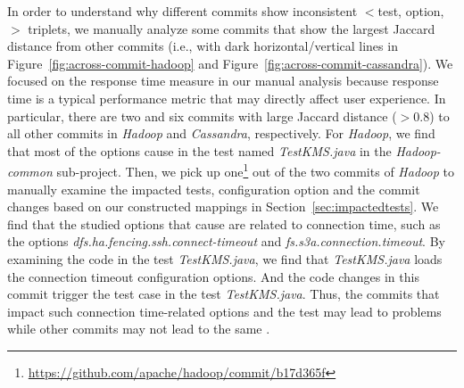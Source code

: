 In order to understand why different commits show inconsistent $<$test, option, \inconsistent$>$ triplets, 
we manually analyze some commits that show the largest Jaccard distance from other commits (i.e., with dark horizontal/vertical lines in Figure~\ref{fig:across-commit-hadoop} and Figure~\ref{fig:across-commit-cassandra}). We focused on the response time measure in our manual analysis because response time is a typical performance metric that may directly affect user experience. %
In particular, there are two and six commits with large Jaccard distance ($>0.8$) to all other commits in \emph{Hadoop} and \emph{Cassandra}, respectively. 
For \emph{Hadoop}, we find that most of the options cause \inconsistent in the test named \emph{TestKMS.java} in the \emph{Hadoop-common} sub-project. 
Then, we pick up one\footnote{\url{https://github.com/apache/hadoop/commit/b17d365f}} out of the two commits of \emph{Hadoop} to manually examine the impacted tests, configuration option and the commit changes based on our constructed mappings in Section~\ref{sec:impactedtests}. %
We find that the studied options that cause \inconsistent are related to connection time, such as the options \emph{dfs.ha.fencing.ssh.connect-timeout} and \emph{fs.s3a.connection.timeout}. By examining the code in the test \emph{TestKMS.java}, we find that \emph{TestKMS.java} loads the connection timeout configuration options. And the code changes in this commit trigger the test case in the test \emph{TestKMS.java}. 
Thus, the commits that impact such connection time-related options and the test may lead to \inconsistent problems while other commits may not lead to the same \inconsistent. %

